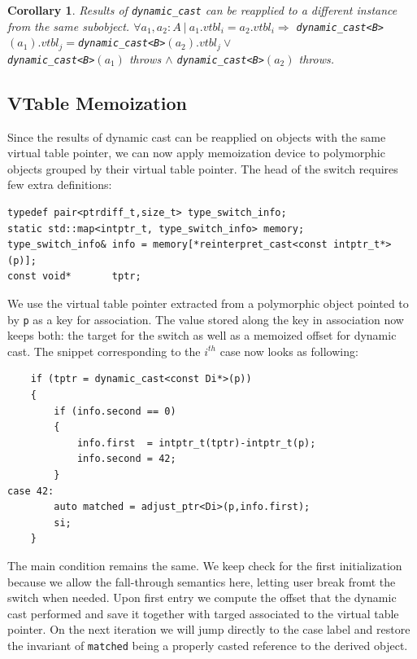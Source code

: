 \documentclass[preprint]{sigplanconf}
\makeatletter
\DeclareRobustCommand{\code}[1]{{\lstinline[breaklines=false,escapechar=@]{#1}}}
\newtheorem{corollary}{Corollary}
\makeatother
\begin{document}
\begin{corollary}
Results of \code{dynamic_cast} can be reapplied to a different instance from the same subobject.
$\forall a_1, a_2 : A\ |\ a_1.vtbl_i = a_2.vtbl_i \Rightarrow$
\code{dynamic_cast<B>}$(a_1).vtbl_j = $\code{dynamic_cast<B>}$(a_2).vtbl_j \vee$ \\
\code{dynamic_cast<B>}$(a_1)$ throws $\wedge$ \code{dynamic_cast<B>}$(a_2)$ 
throws.
\end{corollary}

\subsection{VTable Memoization}

Since the results of dynamic cast can be reapplied on objects with the same 
virtual table pointer, we can now apply memoization device to polymorphic 
objects grouped by their virtual table pointer. The head of the switch requires 
few extra definitions:

\begin{lstlisting}
typedef pair<ptrdiff_t,size_t> type_switch_info;
static std::map<intptr_t, type_switch_info> memory;
type_switch_info& info = memory[*reinterpret_cast<const intptr_t*>(p)];
const void*       tptr; 
\end{lstlisting}

We use the virtual table pointer extracted from a polymorphic object pointed to 
by \code{p} as a key for association. The value stored along the key in 
association now keeps both: the target for the switch as well as a memoized 
offset for dynamic cast. The snippet corresponding to the $i^{th}$ case now 
looks as following:

\begin{lstlisting}
    if (tptr = dynamic_cast<const Di*>(p))
    {
        if (info.second == 0)
        {
            info.first  = intptr_t(tptr)-intptr_t(p);
            info.second = 42;
        }
case 42:
        auto matched = adjust_ptr<Di>(p,info.first); 
        si;
    }
\end{lstlisting}

\noindent
The main condition remains the same. We keep check for the first initialization 
because we allow the fall-through semantics here, letting user break fromt the 
switch when needed. Upon first entry we compute the offset that the dynamic cast 
performed and save it together with targed associated to the virtual table 
pointer. On the next iteration we will jump directly to the case label and 
restore the invariant of \code{matched} being a properly casted reference to the 
derived object.
\end{document}
